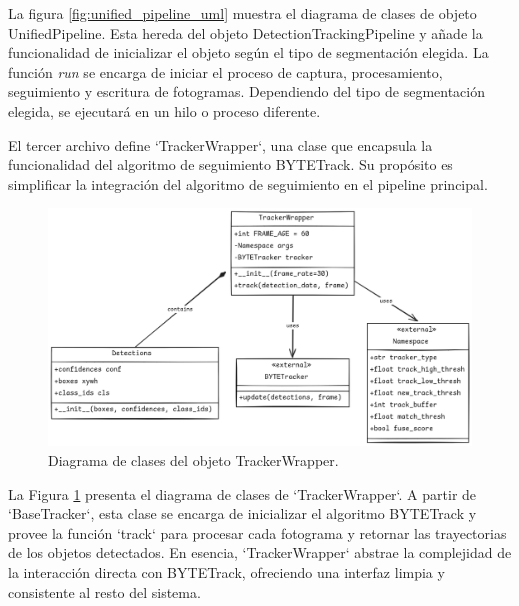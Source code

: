 \documentclass[11pt,spanish,listoffigures,listoftables]{tfgetsinf}
\begin{document}
   La figura \ref{fig:unified_pipeline_uml} muestra el diagrama de clases de objeto UnifiedPipeline. Esta hereda del objeto DetectionTrackingPipeline y añade la funcionalidad de inicializar el objeto según el tipo de segmentación elegida. La función \textit{run} se encarga de iniciar el proceso de captura, procesamiento, seguimiento y escritura de fotogramas. Dependiendo del tipo de segmentación elegida, se ejecutará en un hilo o proceso diferente. 

   


   El tercer archivo define `TrackerWrapper`, una clase que encapsula la funcionalidad del algoritmo de seguimiento BYTETrack. Su propósito es simplificar la integración del algoritmo de seguimiento en el pipeline principal.

   \begin{figure}[H]
      \centering
      \includegraphics[width=1\textwidth]{codigo/images/tracker_wrapper_uml.png}
      \caption[Diagrama de clases del objeto TrackerWrapper]{Diagrama de clases del objeto TrackerWrapper.}
      \label{fig:tracker_wrapper_uml}
   \end{figure}

   La Figura \ref{fig:tracker_wrapper_uml} presenta el diagrama de clases de `TrackerWrapper`. A partir de `BaseTracker`, esta clase se encarga de inicializar el algoritmo BYTETrack y provee la función `track` para procesar cada fotograma y retornar las trayectorias de los objetos detectados. En esencia, `TrackerWrapper` abstrae la complejidad de la interacción directa con BYTETrack, ofreciendo una interfaz limpia y consistente al resto del sistema.
\end{document}
